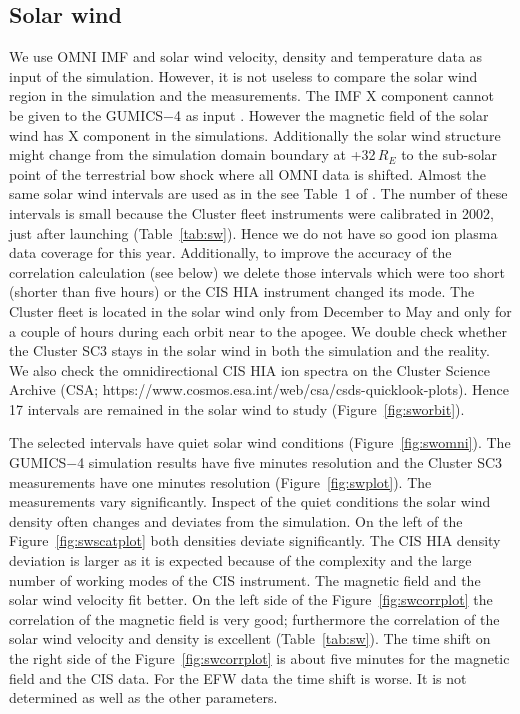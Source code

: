 \documentclass[linenumbers,draft]{agujournal}
\begin{document}
\subsection{Solar wind}
\label{sec:sw}

We use OMNI IMF and solar wind velocity, density and temperature data as input of the simulation. However, it is not useless to compare the solar wind region in the simulation and the measurements. The IMF X component cannot be given to the GUMICS$-$4 as input \citep{janhunen12:_gumic_mhd,facsko16:_one_earth}. However the magnetic field of the solar wind has X component in the simulations. Additionally the solar wind structure might change from the simulation domain boundary at +32\,$R_E$ to the sub-solar point of the terrestrial bow shock where all OMNI data is shifted. Almost the same solar wind intervals are used as in the see Table~1 of \citet{facsko16:_one_earth}. The number of these intervals is small because the Cluster fleet instruments were calibrated in 2002, just after launching (Table~\ref{tab:sw}). Hence we do not have so good ion plasma data coverage for this year. Additionally, to improve the accuracy of the correlation calculation (see below) we delete those intervals which were too short (shorter than five hours) or the CIS HIA instrument changed its mode. The Cluster fleet is located in the solar wind only from December to May and only for a couple of hours during each orbit near to the apogee. We double check whether the Cluster SC3 stays in the solar wind in both the simulation and the reality. We also check the omnidirectional CIS HIA ion spectra on the Cluster Science Archive (CSA; https://www.cosmos.esa.int/web/csa/csds-quicklook-plots). Hence 17 intervals are remained in the solar wind to study (Figure~\ref{fig:sworbit}). 

The selected intervals have quiet solar wind conditions (Figure~\ref{fig:swomni}). The GUMICS$-$4 simulation results have five minutes resolution and the Cluster SC3 measurements have one minutes resolution (Figure~\ref{fig:swplot}). The measurements vary significantly. Inspect of the quiet conditions the solar wind density often changes and deviates from the simulation. On the left of the Figure~\ref{fig:swscatplot} both densities deviate significantly. The CIS HIA density deviation is larger as it is expected because of the complexity and the large number of working modes of the CIS instrument. The magnetic field and the solar wind velocity fit better. On the left side of the Figure~\ref{fig:swcorrplot} the correlation of the magnetic field is very good; furthermore the correlation of the solar wind velocity and density is excellent (Table~\ref{tab:sw}). The time shift on the right side of the Figure~\ref{fig:swcorrplot} is about five minutes for the magnetic field and the CIS data. For the EFW data the time shift is worse. It is not determined as well as the other parameters.
\end{document}
